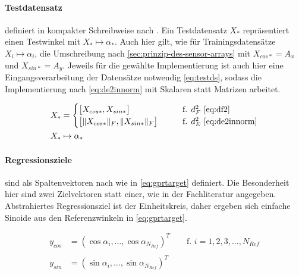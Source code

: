 \paragraph*{Testdatensatz} definiert in kompakter Schreibweise nach \cite{Rasmussen2006}. Ein Testdatensatz $X_*$ repräsentiert einen Testwinkel mit $X_* \mapsto \alpha_*$. Auch hier gilt, wie für Trainingsdatensätze $X_i \mapsto \alpha_i$, die Umschreibung nach \autoref{sec:prinzip-des-sensor-arrays} mit $X_{cos*} = A_x$ und $X_{sin*} = A_y$. Jeweils für die gewählte Implementierung ist auch hier eine Eingangsverarbeitung der Datensätze notwendig \autoref{eq:testds}, sodass die Implementierung nach \autoref{eq:de2innorm} mit Skalaren statt Matrizen arbeitet. 


\begin{align}\label{eq:testds}
	X_* &= 
	\begin{cases}
		\big[ X_{cos*}, X_{sin*} \big]             &\qquad \text{f. } d_F^2 \text{ \eqref{eq:df2}} \\
		\big[ \|X_{cos*}\|_F, \|X_{sin*}\|_F \big] &\qquad \text{f. } d_E^2 \text{ \eqref{eq:de2innorm}}
	\end{cases} \\
	X_* & \mapsto \alpha_* \nonumber
\end{align}


\clearpage


\paragraph*{Regressionsziele} sind als Spaltenvektoren nach \cite{Rasmussen2006} wie in \autoref{eq:gprtarget} definiert. Die Besonderheit hier sind zwei Zielvektoren statt einer, wie in der Fachliteratur \cite{Rasmussen2006} angegeben. Abstrahiertes Regressionsziel ist der Einheitskreis, daher ergeben sich einfache Sinoide aus den Referenzwinkeln in \autoref{eq:gprtarget}.


\begin{align}\label{eq:gprtarget}
	y_{cos} &= (\cos \alpha_i, \ldots, \cos \alpha_{N_{Ref}})^T \qquad \text{f. } i = 1,2,3,\ldots,N_{Ref} \nonumber \\
	\\
	y_{sin} &= (\sin \alpha_i, \ldots, \sin \alpha_{N_{Ref}})^T \nonumber
\end{align}


